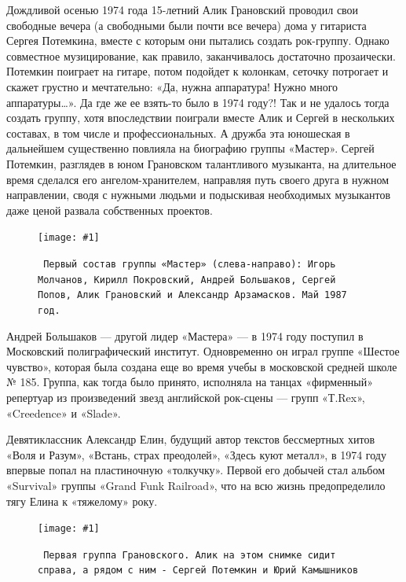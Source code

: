 \documentclass[10pt, twoside]{book}
\newcommand{\myincludegraphics}[1]{\texttt{[image: \#1]}}
\begin{document}
Дождливой осенью 1974 года 15-летний Алик Грановский проводил свои свободные вечера (а свободными были почти все вечера)
дома у гитариста Сергея Потемкина, вместе с которым они пытались создать рок-группу. Однако совместное музицирование,
как правило, заканчивалось достаточно прозаически. Потемкин поиграет на гитаре, потом подойдет к колонкам, сеточку
потрогает и скажет грустно и мечтательно: «Да, нужна аппаратура! Нужно много аппаратуры\ldots». Да где же ее взять-то
было в 1974 году?! Так и не удалось тогда создать группу, хотя впоследствии поиграли вместе Алик и Сергей в нескольких
составах, в том числе и профессиональных. А дружба эта юношеская в дальнейшем существенно повлияла на биографию группы
«Мастер». Сергей Потемкин, разглядев в юном Грановском талантливого музыканта, на длительное время сделался его
ангелом-хранителем, направляя путь своего друга в нужном направлении, сводя с нужными людьми и подыскивая необходимых
музыкантов даже ценой развала собственных проектов.

\begin{figure}[h]
    \centering
    \myincludegraphics{Image01}
    \caption{\texttt{
        Первый состав группы «Мастер» (слева-направо): Игорь Молчанов, Кирилл Покровский, Андрей Большаков, Сергей
        Попов, Алик Грановский и Александр Арзамасков. Май 1987 год.
    }}
\end{figure}

Андрей Большаков — другой лидер «Мастера» — в 1974 году поступил в Московский полиграфический институт. Одновременно он
играл группе «Шестое чувство», которая была создана еще во время учебы в московской средней школе № 185. Группа, как
тогда было принято, исполняла на танцах «фирменный» репертуар из произведений звезд английской рок-сцены — групп
«Т.Rex», «Creedence» и «Slade».

Девятиклассник Александр Елин, будущий автор текстов бессмертных хитов «Воля и Разум», «Встань, страх преодолей»,
«Здесь куют металл», в 1974 году впервые попал на пластиночную «толкучку». Первой его добычей стал альбом «Survival»
группы «Grand Funk Railroad», что на всю жизнь предопределило тягу Елина к «тяжелому» року.

\begin{figure}
    \myincludegraphics{Image02}
    \caption{\texttt{
        Первая группа Грановского. Алик на этом снимке сидит справа, а рядом с ним - Сергей Потемкин и Юрий Камышников
    }}
\end{figure}
\end{document}

